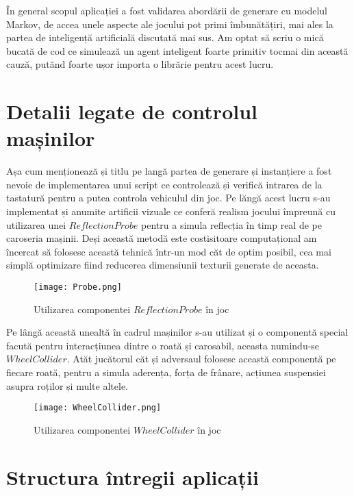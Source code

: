 În general scopul aplicației a fost validarea abordării de generare cu modelul Markov, de accea unele aspecte ale jocului pot primi îmbunătățiri, mai ales la partea de inteligență artificială discutată mai sus. Am optat să scriu o mică bucată de cod ce simulează un agent inteligent foarte primitiv tocmai din această cauză, putănd foarte ușor importa o librărie pentru acest lucru.\par

\section{Detalii legate de controlul mașinilor}

Așa cum menționează și titlu pe langă partea de generare și instanțiere a fost nevoie de implementarea unui script ce controlează și verifică intrarea de la tastatură pentru a putea controla vehiculul din joc. Pe lăngă acest lucru s-au implementat și anumite artificii vizuale ce conferă realism jocului împreună cu utilizarea unei $ReflectionProbe$ pentru a simula reflecția în timp real de pe caroseria mașinii. Deși această metodă este costisitoare computațional am încercat să folosesc această tehnică într-un mod căt de optim posibil, cea mai simplă optimizare fiind reducerea dimensiunii texturii generate de aceasta.\par

\vspace{10mm}
\begin{figure}[H]
\centering
\texttt{[image: Probe.png]} \par
\caption{Utilizarea componentei $ReflectionProbe$ în joc}
\end{figure}

Pe lângă această unealtă în cadrul mașinilor s-au utilizat și o componentă special facută pentru interacțiunea dintre o roată și carosabil, aceasta numindu-se $WheelCollider$. Atăt jucătorul căt și adversaul folosesc această componentă pe fiecare roată, pentru a simula aderența, forța de frânare, acțiunea suspensiei asupra roților și multe altele.\par

\begin{figure}[H]
\centering
\texttt{[image: WheelCollider.png]} \par
\caption{Utilizarea componentei $WheelCollider$ în joc}
\end{figure}

\section{Structura întregii aplicații}

